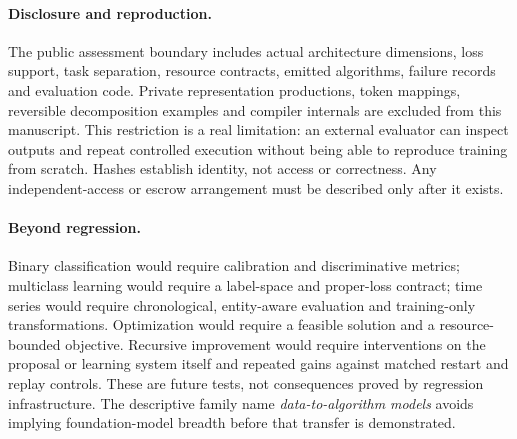 \paragraph{Disclosure and reproduction.}
The public assessment boundary includes actual architecture dimensions,
loss support, task separation, resource contracts, emitted algorithms,
failure records and evaluation code. Private representation productions,
token mappings, reversible decomposition examples and compiler internals
are excluded from this manuscript. This restriction is a real limitation:
an external evaluator can inspect outputs and repeat controlled execution
without being able to reproduce training from scratch. Hashes establish
identity, not access or correctness. Any independent-access or escrow
arrangement must be described only after it exists.

\paragraph{Beyond regression.}
Binary classification would require calibration and discriminative metrics;
multiclass learning would require a label-space and proper-loss contract;
time series would require chronological, entity-aware evaluation and
training-only transformations. Optimization would require a feasible
solution and a resource-bounded objective. Recursive improvement would
require interventions on the proposal or learning system itself and
repeated gains against matched restart and replay controls. These are
future tests, not consequences proved by regression infrastructure. The
descriptive family name \emph{data-to-algorithm models} avoids implying
foundation-model breadth before that transfer is demonstrated.
